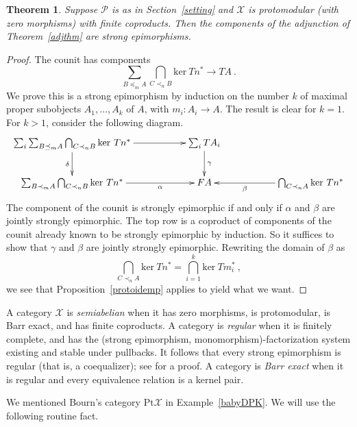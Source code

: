 \documentclass[a4paper,12pt,reqno]{amsart}
\newtheorem{theorem}{Theorem}[section] %
\theoremstyle{definition}
\theoremstyle{fact}
\theoremstyle{genquest}
\theoremstyle{step}
\newcommand{\lra}{\longrightarrow}
\newcommand{\ra}{\rightarrow}
\def\CP{{\mathscr P}}
\def\CX{{\mathscr X}}
\begin{document}
\begin{theorem}\label{protocounit}
Suppose $\CP$ is as in Section~\ref{setting} and $\CX$ is protomodular (with zero morphisms) with finite coproducts.
Then the components of the adjunction of Theorem~\ref{adjthm} are strong epimorphisms.
\end{theorem}
\begin{proof}
The counit has components
$$\sum_{B\preceq_mA}{\bigcap_{C\prec_n B}{\mathrm{ker} \ Tn^*}} \lra TA \ .$$
We prove this is a strong epimorphism by induction on the number $k$ of maximal
proper subobjects $A_1, \dots, A_k$ of $A$, with $m_i:A_i\ra A$. 
The result is clear for $k=1$. For $k>1$, consider the following diagram.
\begin{eqnarray*}
\xymatrix{
\sum_i{\sum_{B\preceq_mA}{\bigcap_{C\prec_n B}{\mathrm{ker} \ Tn^*}}} \ar[rr]^-{ } \ar[d]_-{\delta} && \sum_i{TA_i} \ar[d]^-{\gamma} && \\
\sum_{B\prec_mA}{\bigcap_{C\prec_n B}{\mathrm{ker} \ Tn^*}} \ar[rr]_-{\alpha} && FA && \bigcap_{C\prec_n A}{{\mathrm{ker} \ Tn^*}} \ar[ll]^-{\beta}}
\end{eqnarray*}
The component of the counit is strongly epimorphic if and only if $\alpha$ and
$\beta$ are jointly strongly epimorphic.
The top row is a coproduct of components of the counit already known to be strongly
epimorphic by induction. 
So it suffices to show that $\gamma$ and $\beta$ are jointly strongly epimorphic.
Rewriting the domain of $\beta$ as
$$\bigcap_{C\prec_n A}{{\mathrm{ker} \ Tn^*}} = \bigcap_{i=1}^k{{\mathrm{ker} \ Tm_i^*}} \ ,$$
we see that Proposition~\ref{protoidemp} applies to yield what we want.
\end{proof}

A category $\CX$ is {\em semiabelian} \cite{JMT} when it has zero morphisms, 
is protomodular, is Barr exact, and has finite coproducts.
A category is {\em regular} \cite{Excat} when it is finitely complete, and has the 
(strong epimorphism, monomorphism)-factorization system existing 
and stable under pullbacks. 
It follows that every strong epimorphism is regular (that is, a coequalizer);
see \cite{CarSt86} for a proof. 
A category is {\em Barr exact} when it is regular and every equivalence relation 
is a kernel pair. 

We mentioned Bourn's category $\mathrm{Pt} \CX$ in Example~\ref{babyDPK}.
We will use the following routine fact.
\end{document}
